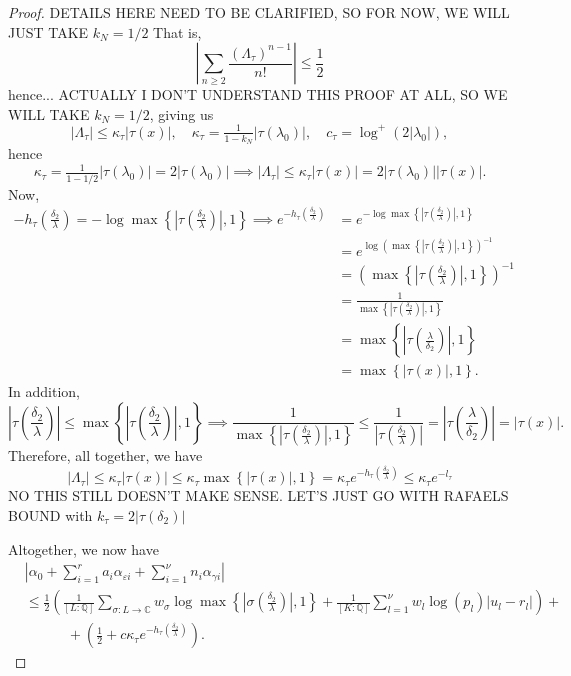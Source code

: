 \begin{proof}
DETAILS HERE NEED TO BE CLARIFIED, SO FOR NOW, WE WILL JUST TAKE $k_N = 1/2$
That is, 
\[\left| \sum_{n\geq 2} \frac{(\Lambda_\tau)^{n-1}}{n!}\right| \leq \frac{1}{2}\]
hence... ACTUALLY I DON'T UNDERSTAND THIS PROOF AT ALL, SO WE WILL TAKE $k_N = 1/2$, giving us 
\[|\Lambda_\tau|\leq \kappa_\tau|\tau(x)|, \quad \kappa_\tau=\tfrac{1}{1-k_N}|\tau(\lambda_0)|,  \quad c_\tau=\log^+(2|\lambda_0|),\] 
hence
\[\kappa_\tau=\tfrac{1}{1-1/2}|\tau(\lambda_0)| = 2|\tau(\lambda_0)| \implies |\Lambda_\tau|\leq \kappa_\tau|\tau(x)| = 2|\tau(\lambda_0)||\tau(x)|.\]
Now, 
\begin{align*}
-h_{\tau}\left(\frac{\delta_2}{\lambda}\right) = -\log \max \left\{ \left|\tau\left(\frac{\delta_2}{\lambda}\right)\right|, 1\right\} \implies e^{-h_{\tau}\left(\frac{\delta_2}{\lambda}\right)} 
	&= e^{-\log \max \left\{ \left|\tau\left(\frac{\delta_2}{\lambda}\right)\right|, 1\right\}}\\
	&= e^{\log \left(\max \left\{ \left|\tau\left(\frac{\delta_2}{\lambda}\right)\right|, 1\right\}\right)^{-1}}\\
	& = \left(\max \left\{ \left|\tau\left(\frac{\delta_2}{\lambda}\right)\right|, 1\right\}\right)^{-1}\\
	& = \frac{1}{\max \left\{ \left|\tau\left(\frac{\delta_2}{\lambda}\right)\right|, 1\right\}}\\
	& = \max \left\{ \left|\tau\left(\frac{\lambda}{\delta_2}\right)\right|, 1\right\}\\
	& = \max \left\{ \left|\tau(x)\right|, 1\right\}.
\end{align*}
In addition, 
\[ \left|\tau\left(\frac{\delta_2}{\lambda}\right)\right| \leq \max \left\{ \left|\tau\left(\frac{\delta_2}{\lambda}\right)\right|, 1\right\} \implies \frac{1}{\max \left\{ \left|\tau\left(\frac{\delta_2}{\lambda}\right)\right|, 1\right\}} \leq \frac{1}{\left|\tau\left(\frac{\delta_2}{\lambda}\right)\right|} = {\left|\tau\left(\frac{\lambda}{\delta_2}\right)\right|}=| \tau(x)|.\]
Therefore, all together, we have
\[ |\Lambda_\tau|\leq \kappa_\tau|\tau(x)| \leq \kappa_{\tau}\max\left\{|\tau(x)|, 1\right\} = \kappa_{\tau}e^{-h_{\tau}\left(\frac{\delta_2}{\lambda}\right)} \leq \kappa_{\tau} e^{-l_{\tau}}\]
NO THIS STILL DOESN'T MAKE SENSE. LET'S JUST GO WITH RAFAELS BOUND with $k_{\tau} = 2|\tau(\delta_2)|$







Altogether, we now have
\begin{align*}
&\left|\alpha_0+\sum_{i = 1}^r a_i \alpha_{\varepsilon i} + \sum_{i = 1}^{\nu} n_i \alpha_{\gamma i}\right|\\
	& \leq \frac{1}{2}\left(\frac{1}{[L:\mathbb{Q}]}\sum_{\sigma :L \to \mathbb{C}} w_{\sigma}\log \max \left\{ \left|\sigma\left(\frac{\delta_2}{\lambda}\right)\right|, 1\right\} + \frac{1}{[K:\mathbb{Q}]}\sum_{l = 1}^{\nu}w_l \log(p_l)|u_l - r_l|\right) + \\
	& \quad \quad \quad + \left(\frac{1}{2} + c\kappa_{\tau}e^{-h_{\tau}\left(\frac{\delta_2}{\lambda}\right)}\right).
\end{align*} 


\end{proof}
